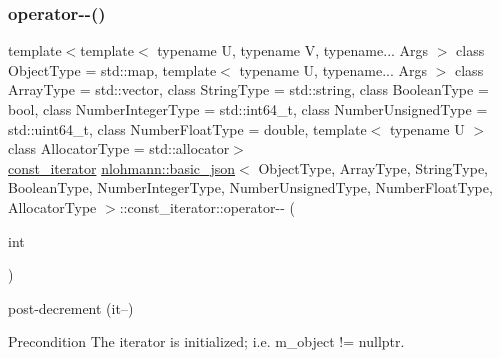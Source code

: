 \subsubsection{\texorpdfstring{operator-\/-\/()}{operator--()}\hspace{0.1cm}{\footnotesize\ttfamily [1/2]}}
{\footnotesize\ttfamily template$<$template$<$ typename U, typename V, typename... Args $>$ class Object\+Type = std\+::map, template$<$ typename U, typename... Args $>$ class Array\+Type = std\+::vector, class String\+Type  = std\+::string, class Boolean\+Type  = bool, class Number\+Integer\+Type  = std\+::int64\+\_\+t, class Number\+Unsigned\+Type  = std\+::uint64\+\_\+t, class Number\+Float\+Type  = double, template$<$ typename U $>$ class Allocator\+Type = std\+::allocator$>$ \\
\hyperlink{classnlohmann_1_1basic__json_1_1const__iterator}{const\+\_\+iterator} \hyperlink{classnlohmann_1_1basic__json}{nlohmann\+::basic\+\_\+json}$<$ Object\+Type, Array\+Type, String\+Type, Boolean\+Type, Number\+Integer\+Type, Number\+Unsigned\+Type, Number\+Float\+Type, Allocator\+Type $>$\+::const\+\_\+iterator\+::operator-\/-\/ (\begin{DoxyParamCaption}\item[{int}]{ }\end{DoxyParamCaption})\hspace{0.3cm}{\ttfamily [inline]}}



post-\/decrement (it--) 

\begin{DoxyPrecond}{Precondition}
The iterator is initialized; i.\+e. {\ttfamily m\+\_\+object != nullptr}. 
\end{DoxyPrecond}
\hypertarget{classnlohmann_1_1basic__json_1_1const__iterator_adeb2ff3fdf3cc301b72db109934c9199}{}\label{classnlohmann_1_1basic__json_1_1const__iterator_adeb2ff3fdf3cc301b72db109934c9199} 
